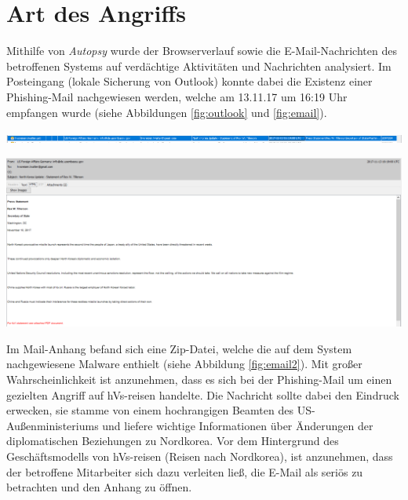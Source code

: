 \chapter{Art des Angriffs}

Mithilfe von \textit{Autopsy} wurde der Browserverlauf sowie die E-Mail-Nachrichten des betroffenen Systems auf verdächtige Aktivitäten und Nachrichten analysiert. 
Im Posteingang (lokale Sicherung von Outlook) konnte dabei die Existenz einer Phishing-Mail nachgewiesen werden, welche am 13.11.17 um 16:19 Uhr empfangen wurde (siehe Abbildungen \ref{fig:outlook} und \ref{fig:email}).

\begin{center}
	\includegraphics[width=15.8cm]{figures/outlook.png}
	\label{fig:outlook}
\end{center}

\begin{center}
	\includegraphics[width=15.8cm]{figures/email.png}
	\label{fig:email}
\end{center}

Im Mail-Anhang befand sich eine Zip-Datei, welche die auf dem System nachgewiesene Malware  enthielt (siehe Abbildung \ref{fig:email2}).
Mit großer Wahrscheinlichkeit ist anzunehmen, dass es sich bei der Phishing-Mail um einen gezielten Angriff auf hVs-reisen handelte.
Die Nachricht sollte dabei den Eindruck erwecken, sie stamme von einem hochrangigen Beamten des US-Außenministeriums und liefere wichtige Informationen über Änderungen der diplomatischen Beziehungen zu Nordkorea.
Vor dem Hintergrund des Geschäftsmodells von hVs-reisen (Reisen nach Nordkorea), ist anzunehmen, dass der betroffene Mitarbeiter sich dazu verleiten ließ, die E-Mail als seriös zu betrachten und den Anhang zu öffnen.

